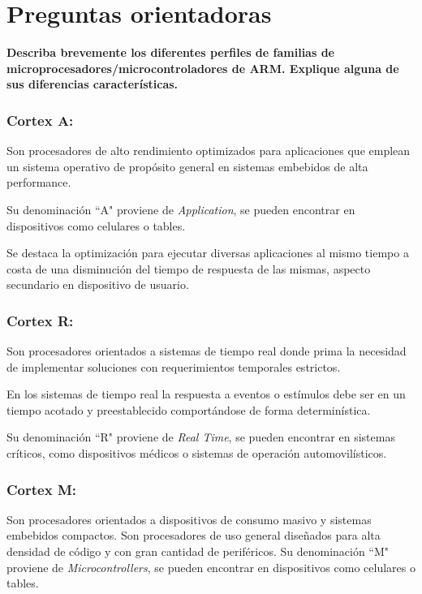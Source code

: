 \documentclass[10pt,a4paper,twoside,spanish]{article}	%
\begin{document}
\section*{Preguntas orientadoras}

\textbf{Describa brevemente los diferentes perfiles de familias de
microprocesadores/microcontroladores de ARM. Explique alguna de sus diferencias
características.}

\subsubsection*{Cortex A:}
Son procesadores de alto rendimiento optimizados para aplicaciones que emplean un sistema operativo de propósito general en sistemas embebidos de alta performance. 

Su denominación ``A" proviene de \textit{Application}, se pueden encontrar en dispositivos como celulares o tables.  
 
Se destaca la optimización para ejecutar diversas aplicaciones al mismo tiempo a costa de una disminución del tiempo de respuesta de las mismas, aspecto secundario en dispositivo de usuario. 


\subsubsection*{Cortex R:}

Son procesadores orientados a sistemas de tiempo real donde prima la
necesidad de implementar soluciones con requerimientos temporales estrictos.

En los sistemas de tiempo real la respuesta a eventos o estímulos debe ser en un tiempo acotado y preestablecido comportándose de forma determinística.  

Su denominación ``R" proviene de \textit{Real Time}, se pueden encontrar en sistemas críticos, como dispositivos médicos o sistemas de operación automovilísticos.


\subsubsection*{Cortex M:}


Son procesadores orientados a dispositivos de consumo masivo y sistemas
embebidos compactos. Son procesadores de uso general diseñados para alta densidad de código y con gran cantidad de periféricos. Su denominación ``M" proviene de \textit{Microcontrollers}, se pueden encontrar en dispositivos como celulares o tables. 
\end{document}
